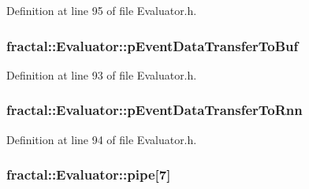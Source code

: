 Definition at line 95 of file Evaluator.\+h.

\hypertarget{classfractal_1_1Evaluator_a8b97c09b92c03045342a14239bf6efdf}{
\subsubsection[{p\+Event\+Data\+Transfer\+To\+Buf}]{ fractal\+::\+Evaluator\+::p\+Event\+Data\+Transfer\+To\+Buf\hspace{0.3cm}{\ttfamily [protected]}}}\label{classfractal_1_1Evaluator_a8b97c09b92c03045342a14239bf6efdf}


Definition at line 93 of file Evaluator.\+h.

\hypertarget{classfractal_1_1Evaluator_a8548966331cd0aa862ec992a720a5e1f}{
\subsubsection[{p\+Event\+Data\+Transfer\+To\+Rnn}]{ fractal\+::\+Evaluator\+::p\+Event\+Data\+Transfer\+To\+Rnn\hspace{0.3cm}{\ttfamily [protected]}}}\label{classfractal_1_1Evaluator_a8548966331cd0aa862ec992a720a5e1f}


Definition at line 94 of file Evaluator.\+h.

\hypertarget{classfractal_1_1Evaluator_af1b7a76f5d14c5447561cbda1ecd37d6}{
\subsubsection[{pipe}]{ fractal\+::\+Evaluator\+::pipe\mbox{[}7\mbox{]}\hspace{0.3cm}{\ttfamily [protected]}}}\label{classfractal_1_1Evaluator_af1b7a76f5d14c5447561cbda1ecd37d6}


